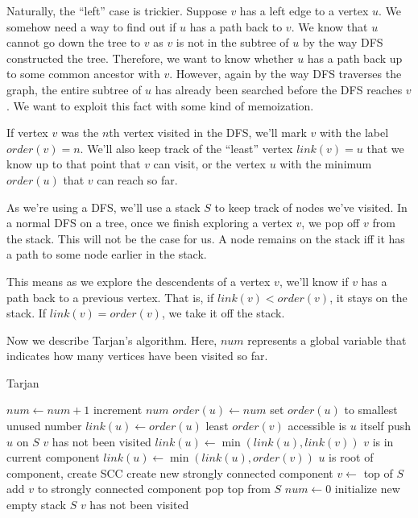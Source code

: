 Naturally, the ``left'' case is trickier. Suppose $v$ has a left edge to a vertex $u$. We somehow need a way to find out if $u$ has a path back to $v$. We know that $u$ cannot go down the tree to $v$ as $v$ is not in the subtree of $u$ by the way DFS constructed the tree. Therefore, we want to know whether $u$ has a path back up to some common ancestor with $v$. However, again by the way DFS traverses the graph, the entire subtree of $u$ has already been searched before the DFS reaches $v$. We want to exploit this fact with some kind of memoization.

If vertex $v$ was the $n$th vertex visited in the DFS, we'll mark $v$ with the label $order(v) = n$. We'll also keep track of the ``least'' vertex $link(v)=u$ that we know up to that point that $v$ can visit, or the vertex $u$ with the minimum $order(u)$ that $v$ can reach so far.

As we're using a DFS, we'll use a stack $S$ to keep track of nodes we've visited. In a normal DFS on a tree, once we finish exploring a vertex $v$, we pop off $v$ from the stack. This will not be the case for us. A node remains on the stack iff it has a path to some node earlier in the stack.

This means as we explore the descendents of a vertex $v$, we'll know if $v$ has a path back to a previous vertex. That is, if $link(v) < order(v)$, it stays on the stack. If $link(v) = order(v)$, we take it off the stack.

Now we describe Tarjan's algorithm. Here, $num$ represents a global variable that indicates how many vertices have been visited so far.

\begin{algorithm}[H]
\caption{Tarjan}
\begin{algorithmic}
	\State $num \gets num + 1$		\Comment increment $num$
	\State $order(u) \gets num$		\Comment set $order(u)$ to smallest unused number
	\State $link(u) \gets order(u)$	\Comment least $order(v)$ accessible is $u$ itself
	\State push $u$ on $S$
			\Comment $v$ has not been visited
			\State {}
			\State $link(u) \gets \min(link(u), link(v))$
				\Comment $v$ is in current component
			\State $link(u) \gets \min(link(u), order(v))$
		\EndIf
	\EndFor
				\Comment $u$ is root of component, create SCC
		\State create new strongly connected component
		\Repeat
			\State $v \gets$ top of $S$
			\State add $v$ to strongly connected component
			\State pop top from $S$
	\EndIf
\EndFunction
{}
	\State $num \gets 0$
	\State initialize new empty stack $S$
			\Comment $v$ has not been visited
			\State {}
		\EndIf
	\EndFor
\EndFunction
\end{algorithmic}
\end{algorithm}

